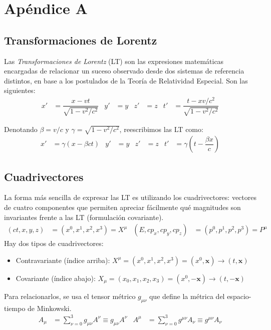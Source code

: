 \appendix
\chapter*{Apéndice A}\label{appendix}
\setcounter{section}{0}
\renewcommand{\thesection}{A.\arabic{section}}

\section{Transformaciones de Lorentz}\label{cap:Lorentz}
Las \textit{Transformaciones de Lorentz} (LT) son las expresiones matemáticas encargadas de relacionar un suceso observado desde dos sistemas de referencia distintos, en base a los postulados de la Teoría de Relatividad Especial. Son las siguientes:
\setlength{\abovedisplayskip}{6pt}
\setlength{\belowdisplayskip}{6pt}
\begin{align}
x' &= \dfrac{x-vt}{\sqrt{1-v^2/c^2}} & y' &=y & z' &=z & t' &=\dfrac{t-xv/c^2}{\sqrt{1-v^2/c^2}}\label{eq:TLorentz1}
\end{align}

Denotando $\beta=v/c$ y $\gamma=\sqrt{1-v^2/c^2}$, reescribimos las LT como:
\begin{align}
x' &= \gamma(x-\beta ct) & y' &=y & z' &=z & t' &=\gamma \left(t-\dfrac{\beta x}{c}\right) \label{eq:TLorentz2}
\end{align}

\section{Cuadrivectores}\label{cap:four-vectors}
La forma más sencilla de expresar las LT es utilizando los cuadrivectores: vectores de cuatro componentes que permiten apreciar fácilmente qué magnitudes son invariantes frente a las LT (formulación covariante).
\begin{align}
(ct,x, y, z) &=(x^0, x^1, x^2, x^3)=X^\mu & (E,cp_x, cp_y, cp_z) &=(p^0, p^1, p^2, p^3)=P^\mu
\end{align}
Hay dos tipos de cuadrivectores:
\begin{itemize}
\item Contravariante (índice arriba): $X^\mu=(x^0, x^1, x^2, x^3)=(x^0,\textbf{x}) \rightarrow (t,\textbf{x})$
\item Covariante (índice abajo): $X_\mu=(x_0, x_1, x_2, x_3)=(x^0,-\textbf{x}) \rightarrow (t,-\textbf{x})$
\end{itemize} 
Para relacionarlos, se usa el tensor métrico $g_{\mu\nu}$ que define la métrica del espacio-tiempo de Minkowski. \cite{MCR}
\begin{align}
A_{\mu } &=\sum ^{3}_{\nu =0}g_{\mu \nu }A^{\nu} \equiv g_{\mu \nu }A^{\nu} & A^{\mu } &=\sum ^{3}_{\nu =0}g^{\mu \nu }A_{\nu} \equiv g^{\mu \nu }A_{\nu} \label{eq:metrica}
\end{align}

